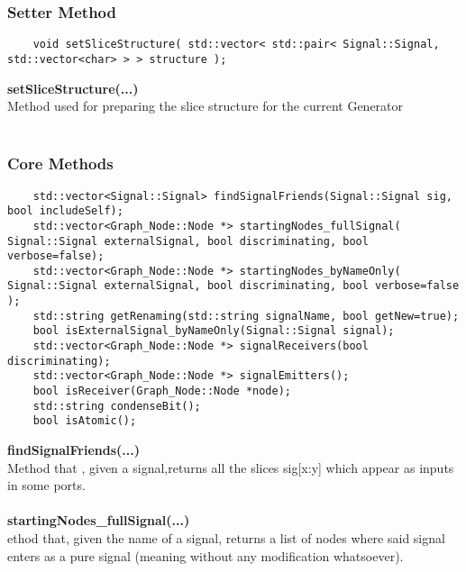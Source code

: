 \documentclass{article}
\begin{document}
\subsubsection{Setter Method}

\begin{mdframed}[hidealllines=true, backgroundcolor=magenta!10]
	\begin{lstlisting}
	void setSliceStructure( std::vector< std::pair< Signal::Signal, std::vector<char> > > structure );
	\end{lstlisting}
\end{mdframed}

\textbf{setSliceStructure(...)}\\
Method used for preparing the slice structure for the current Generator\\\\

\subsubsection{Core Methods}

\begin{mdframed}[hidealllines=true, backgroundcolor=magenta!10]
	\begin{lstlisting}
	std::vector<Signal::Signal> findSignalFriends(Signal::Signal sig, bool includeSelf);
	std::vector<Graph_Node::Node *> startingNodes_fullSignal( Signal::Signal externalSignal, bool discriminating, bool verbose=false);
	std::vector<Graph_Node::Node *> startingNodes_byNameOnly( Signal::Signal externalSignal, bool discriminating, bool verbose=false );
	std::string getRenaming(std::string signalName, bool getNew=true);
	bool isExternalSignal_byNameOnly(Signal::Signal signal);
	std::vector<Graph_Node::Node *> signalReceivers(bool discriminating);
	std::vector<Graph_Node::Node *> signalEmitters();
	bool isReceiver(Graph_Node::Node *node);
	std::string condenseBit();
	bool isAtomic();
	\end{lstlisting}
\end{mdframed}

\textbf{findSignalFriends(...)}\\
Method that , given a signal,returns all the slices sig[x:y] which appear as inputs in some ports.\\\\

\textbf{startingNodes\_fullSignal(...)}\\
ethod that, given the name of a signal, returns a list of nodes where said signal enters as a pure signal (meaning without any modification whatsoever).\\\\
\end{document}
